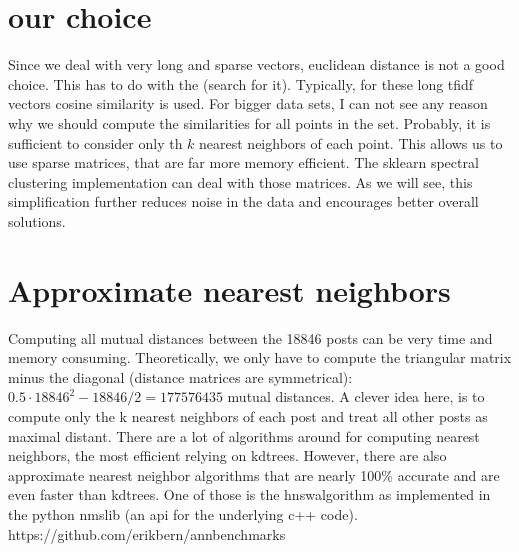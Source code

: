 \documentclass[letterpaper,10pt,english]{jupyterBook}
\begin{document}
\chapter{our choice}
\label{\detokenize{Text_Clustering:our-choice}}
\sphinxAtStartPar
Since we deal with very long and sparse vectors, euclidean distance is not a good choice. This has to do with the  (search for it). Typically, for these long tf\sphinxhyphen{}idf vectors cosine similarity is used. For bigger data sets, I can not see any reason why we should compute the similarities for all points in the set. Probably, it is sufficient to consider only th \(k\) nearest neighbors of each point. This allows us to use sparse matrices, that are far more memory efficient. The sklearn spectral clustering implementation can deal with those matrices. As we will see, this simplification further reduces noise in the data and encourages better overall solutions.


\chapter{Approximate nearest neighbors}
\label{\detokenize{Text_Clustering:approximate-nearest-neighbors}}
\sphinxAtStartPar
Computing all mutual distances between the 18846 posts can be very time and memory consuming. Theoretically, we only have to compute the triangular matrix minus the diagonal (distance matrices are symmetrical):
\(0.5 \cdot 18846^2 - 18846/2 = 177576435\) mutual distances. A clever idea here, is to compute only the k nearest neighbors of each post and treat all other posts as maximal distant. There are a lot of algorithms around for computing nearest neighbors, the most efficient relying on kd\sphinxhyphen{}trees.
However, there are also approximate nearest neighbor algorithms that are nearly 100\% accurate and are even faster than kd\sphinxhyphen{}trees. One of those is the hnsw\sphinxhyphen{}algorithm as implemented in the python nmslib (an api for the underlying c++ code). 
https://github.com/erikbern/ann\sphinxhyphen{}benchmarks
\end{document}
